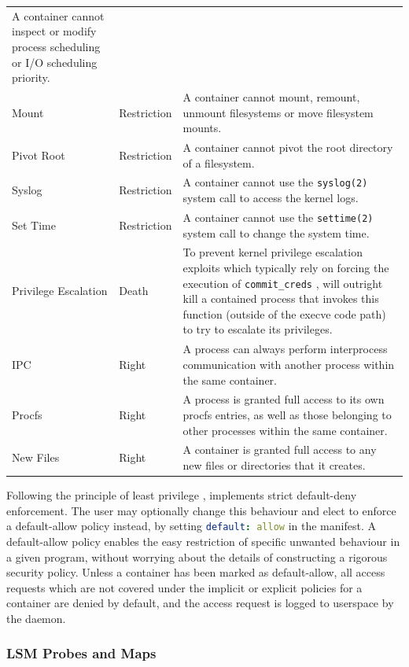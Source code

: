 \begin{longtable}[c]{llp{25em}}
    A container cannot inspect or modify process scheduling or I/O scheduling priority. \\
  Mount & Restriction &
    A container cannot mount, remount, unmount filesystems or move filesystem mounts. \\
  Pivot Root & Restriction &
    A container cannot pivot the root directory of a filesystem. \\
  Syslog & Restriction &
    A container cannot use the \texttt{syslog(2)} system call to access the kernel logs. \\
  Set Time & Restriction &
    A container cannot use the \texttt{settime(2)} system call to change the system time. \\
  \midrule
  Privilege Escalation & Death &
    To prevent kernel privilege escalation exploits which typically rely on forcing the execution of \texttt{commit\_creds} \cite{xin2018_container_security}, \bpfcontain{} will outright kill a contained process that invokes this function (outside of the execve code path) to try to escalate its privileges. \\
  \midrule
  IPC & Right &
    A process can always perform interprocess communication with another process within the same container. \\
  Procfs & Right &
    A process is granted full access to its own procfs entries, as well as those belonging to other processes within the same container. \\
  New Files & Right &
    A container is granted full access to any new files or directories that it creates. \\
  \bottomrule
\end{longtable}
\endgroup

Following the principle of least privilege \cite{saltzer1975_protection}, \bpfcontain{} implements strict default-deny enforcement. The user may optionally change this behaviour and elect to enforce a default-allow policy instead, by setting \lstinline[language=yaml]{default: allow} in the manifest. A default-allow policy enables the easy restriction of specific unwanted behaviour in a given program, without worrying about the details of constructing a rigorous security policy.  Unless a container has been marked as default-allow, all access requests which are not covered under the implicit or explicit policies for a container are denied by default, and the access request is logged to userspace by the \bpfcontain{} daemon.

\subsubsection{LSM Probes and Maps}

